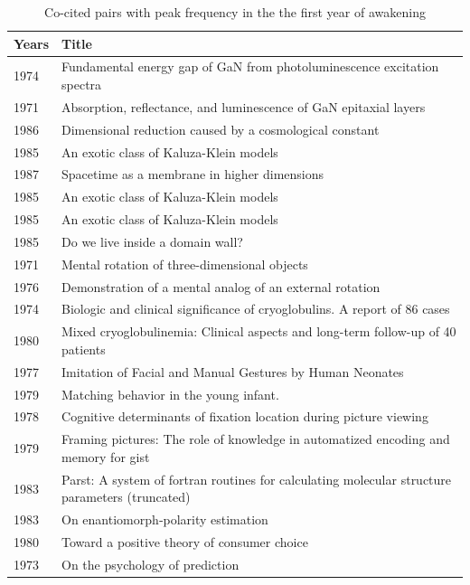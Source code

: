 \documentclass[utf8]{frontiersSCNS}
\newcommand\Tstrut{\rule{0pt}{2.9ex}} %
\begin{document}
\begin{table}[ht]
\caption{Co-cited pairs with peak frequency in the the first year of awakening}%
\centering %
\begin{center}
\begin{tabular}{ll} 
\hline %
Years & Title \Tstrut\\
\hline 
\tiny{1974} & \tiny{Fundamental energy gap of GaN from photoluminescence excitation spectra} \Tstrut\\
\tiny{1971} &  \tiny{Absorption, reflectance, and luminescence of GaN epitaxial layers} \\
\hline
\tiny{1986} & \tiny{Dimensional reduction caused by a cosmological constant} \\
\tiny{1985} & \tiny{An exotic class of Kaluza-Klein models} \\
\hline
\tiny{1987} & \tiny{Spacetime as a membrane in higher dimensions} \\
\tiny{1985} & \tiny{An exotic class of Kaluza-Klein models} \\
\hline 
\tiny{1985} & \tiny{An exotic class of Kaluza-Klein models} \\
\tiny{1985} & \tiny{Do we live inside a domain wall?} \\
\hline
\tiny{1971} & \tiny{Mental rotation of three-dimensional objects} \\
\tiny{1976} & \tiny{Demonstration of a mental analog of an external rotation} \\
\hline
\tiny{1974} & \tiny{Biologic and clinical significance of cryoglobulins. A report of 86 cases} \\
\tiny{1980} & \tiny{Mixed cryoglobulinemia: Clinical aspects and long-term follow-up of 40 patients} \\
\hline
\tiny{1977} & \tiny{Imitation of Facial and Manual Gestures by Human Neonates} \\
\tiny{1979} & \tiny{Matching behavior in the young infant.} \\ 
\hline
\tiny{1978} & \tiny{Cognitive determinants of fixation location during picture viewing} \\
\tiny{1979} & \tiny{Framing pictures: The role of knowledge in automatized encoding and memory for gist} \\
\hline
\tiny{1983} & \tiny{Parst: A system of fortran routines for calculating molecular structure parameters (truncated)} \\
\tiny{1983} & \tiny{On enantiomorph‐polarity estimation} \\
\hline
\tiny{1980} & \tiny{Toward a positive theory of consumer choice} \\
\tiny{1973} & \tiny{On the psychology of prediction} \\
\hline 
\end{tabular}
\end{center}
\label{tab:table3} %
\end{table}
\end{document}
